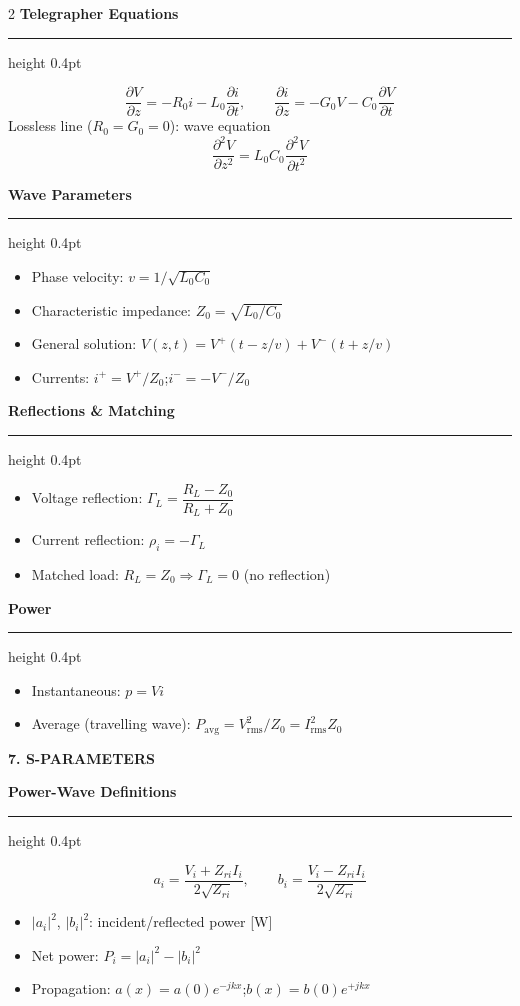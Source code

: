 \documentclass[10pt,a4paper]{article}
\newcommand{\sectionbox}[1]{%
  \vspace{3pt}%
  \noindent\colorbox{headerbg}{\parbox{\linewidth-2\fboxsep}%
    {\bfseries\small\color{white}\MakeUppercase{#1}}}%
  \vspace{1pt}%
}
\newcommand{\subsec}[1]{%
  \vspace{3pt}%
  {\small\bfseries\color{subseccolor}#1}%
  \vspace{1pt}\hrule height 0.4pt \vspace{2pt}%
}
\begin{document}
\begin{multicols}{2}
\subsec{Telegrapher Equations}
\[
\frac{\partial V}{\partial z}=-R_0 i-L_0\frac{\partial i}{\partial t},\qquad
\frac{\partial i}{\partial z}=-G_0 V-C_0\frac{\partial V}{\partial t}
\]
Lossless line ($R_0=G_0=0$): wave equation
\[
\frac{\partial^2 V}{\partial z^2}=L_0C_0\frac{\partial^2 V}{\partial t^2}
\]

\subsec{Wave Parameters}
\begin{itemize}
  \item Phase velocity: $v=1/\sqrt{L_0C_0}$
  \item Characteristic impedance: $Z_0=\sqrt{L_0/C_0}$
  \item General solution: $V(z,t)=V^+(t-z/v)+V^-(t+z/v)$
  \item Currents: $i^+=V^+/Z_0$;\quad $i^-=-V^-/Z_0$
\end{itemize}

\subsec{Reflections \& Matching}
\begin{itemize}
  \item Voltage reflection: $\Gamma_L=\dfrac{R_L-Z_0}{R_L+Z_0}$
  \item Current reflection: $\rho_i=-\Gamma_L$
  \item Matched load: $R_L=Z_0\Rightarrow\Gamma_L=0$ (no reflection)
\end{itemize}

\subsec{Power}
\begin{itemize}
  \item Instantaneous: $p=Vi$
  \item Average (travelling wave): $P_\text{avg}=V_\text{rms}^2/Z_0=I_\text{rms}^2Z_0$
\end{itemize}

\sectionbox{7. S-Parameters}

\subsec{Power-Wave Definitions}
\[
a_i=\frac{V_i+Z_{ri}I_i}{2\sqrt{Z_{ri}}},\qquad
b_i=\frac{V_i-Z_{ri}I_i}{2\sqrt{Z_{ri}}}
\]
\begin{itemize}
  \item $|a_i|^2$, $|b_i|^2$: incident/reflected power [W]
  \item Net power: $P_i=|a_i|^2-|b_i|^2$
  \item Propagation: $a(x)=a(0)e^{-jkx}$;\quad $b(x)=b(0)e^{+jkx}$
\end{itemize}


\end{multicols}
\end{document}
